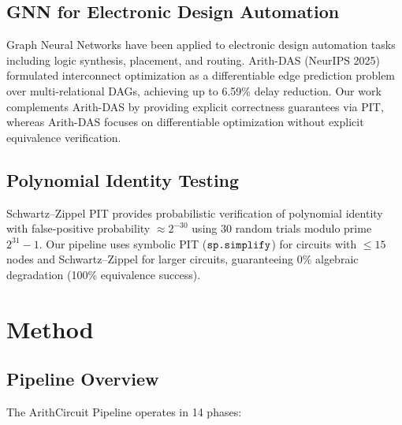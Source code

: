 \documentclass[10pt]{article}
\begin{document}
\subsection{GNN for Electronic Design Automation}
Graph Neural Networks have been applied to electronic design automation tasks
including logic synthesis, placement, and routing. Arith-DAS (NeurIPS 2025)
formulated interconnect optimization as a differentiable edge prediction
problem over multi-relational DAGs, achieving up to 6.59\% delay reduction.
Our work complements Arith-DAS by providing explicit correctness guarantees via
PIT, whereas Arith-DAS focuses on differentiable optimization without explicit
equivalence verification.

\subsection{Polynomial Identity Testing}
Schwartz–Zippel PIT provides probabilistic verification of polynomial identity
with false-positive probability $\approx 2^{-30}$ using 30 random trials modulo
prime $2^{31}-1$. Our pipeline uses symbolic PIT ($\text{\texttt{sp.simplify}}$)
for circuits with $\leq 15$ nodes and Schwartz–Zippel for larger circuits,
guaranteeing 0\% algebraic degradation (100\% equivalence success).

\section{Method}

\subsection{Pipeline Overview}

The ArithCircuit Pipeline operates in 14 phases:
\end{document}
